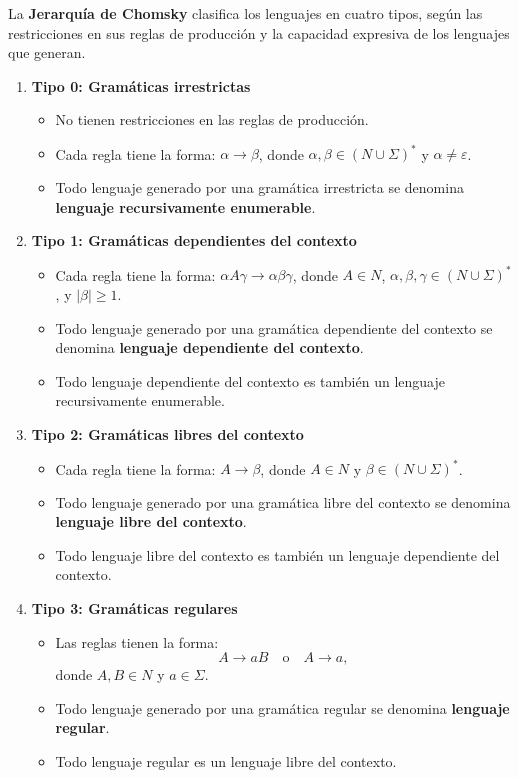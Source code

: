 \documentclass[12pt]{article}
\begin{document}
La \textbf{Jerarquía de Chomsky} clasifica los lenguajes en cuatro tipos, según las restricciones en sus reglas de producción y la capacidad expresiva de los lenguajes que generan.

\begin{enumerate}
  \item \textbf{Tipo 0: Gramáticas irrestrictas}
        \begin{itemize}
          \item No tienen restricciones en las reglas de producción.
          \item Cada regla tiene la forma: \(\alpha \to \beta\), donde \(\alpha, \beta \in (N \cup \Sigma)^*\) y \(\alpha \neq \varepsilon\).
          \item Todo lenguaje generado por una gramática irrestricta se denomina \textbf{lenguaje recursivamente enumerable}.
        \end{itemize}
        
  \item \textbf{Tipo 1: Gramáticas dependientes del contexto}
        \begin{itemize}
          \item Cada regla tiene la forma: \(\alpha A \gamma \to \alpha \beta \gamma\), donde \(A \in N\), \(\alpha, \beta, \gamma \in (N \cup \Sigma)^*\), y \(|\beta| \geq 1\).
          \item Todo lenguaje generado por una gramática dependiente del contexto se denomina \textbf{lenguaje dependiente del contexto}.
          \item Todo lenguaje dependiente del contexto es también un lenguaje recursivamente enumerable.
        \end{itemize}
        
  \item \textbf{Tipo 2: Gramáticas libres del contexto}
        \begin{itemize}
          \item Cada regla tiene la forma: \(A \to \beta\), donde \(A \in N\) y \(\beta \in (N \cup \Sigma)^*\).
          \item Todo lenguaje generado por una gramática libre del contexto se denomina \textbf{lenguaje libre del contexto}.
          \item Todo lenguaje libre del contexto es también un lenguaje dependiente del contexto.
        \end{itemize}
        
  \item \textbf{Tipo 3: Gramáticas regulares}
        \begin{itemize}
          \item Las reglas tienen la forma:
                \[
                  A \to aB \quad \text{o} \quad A \to a,
                \]
                donde \(A, B \in N\) y \(a \in \Sigma\).
          \item Todo lenguaje generado por una gramática regular se denomina \textbf{lenguaje regular}.
          \item Todo lenguaje regular es un lenguaje libre del contexto.
        \end{itemize}
\end{enumerate}
\end{document}

